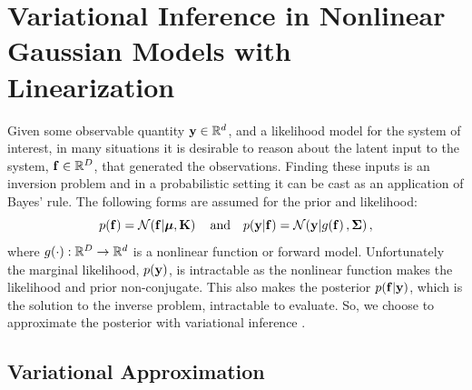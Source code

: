 \documentclass{article} %
\begin{document}
\section{Variational Inference in Nonlinear Gaussian Models with Linearization}
\label{sec:gausmod}

Given some observable quantity $\mathbf{y} \in \mathbb{R}^{d}$, and a likelihood model for
the system of interest, in many situations it is desirable to reason about the
latent input to the system, $\mathbf{f}\in\mathbb{R}^{D}$, that generated the
observations. Finding these inputs is an inversion problem and in a
probabilistic setting it can be cast as an application of Bayes' rule.
The following forms are assumed for the prior and likelihood:
\begin{equation}
    p\!\left({\mathbf{f}}\right) = \mathcal{N}\!\left({\mathbf{f}}\middle\vert{\ensuremath{\boldsymbol{\mu}}, \ensuremath{\mathbf{K}}}\right)
    \quad \text{and} \quad
    p\!\left({\mathbf{y}}\middle\vert{\ensuremath{\mathbf{f}}}\right) = \mathcal{N}\!\left({\mathbf{y}}\middle\vert{\ensuremath{g\!\left({{\mathbf{f}}}\right)}, \ensuremath{\boldsymbol{\Sigma}}}\right),
    \label{eq:priorlike}
\end{equation}
where $g\!\left({{\cdot}}\right) : \mathbb{R}^{D} \to \mathbb{R}^{d}$ is a nonlinear function or
forward model. Unfortunately the marginal likelihood, $p\!\left({\mathbf{y}}\right)$, is
intractable as the nonlinear function makes the likelihood and prior
non-conjugate.
This also makes the posterior $p\!\left({\mathbf{f}}\middle\vert{\ensuremath{\mathbf{y}}}\right)$, which is the solution to
the inverse problem, intractable to evaluate.  So, we choose to approximate the
posterior with variational inference \cite{Jordan1999}.


\subsection{Variational Approximation}
\end{document}
